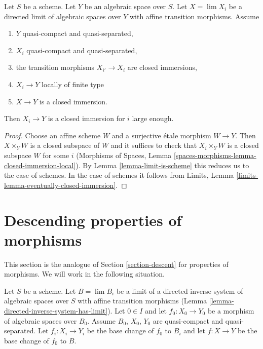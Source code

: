 \begin{lemma}
\label{lemma-eventually-closed-immersion}
Let $S$ be a scheme. Let $Y$ be an algebraic space over $S$.
Let $X = \lim X_i$ be a directed limit of algebraic spaces
over $Y$ with affine transition morphisms. Assume
\begin{enumerate}
\item $Y$ quasi-compact and quasi-separated,
\item $X_i$ quasi-compact and quasi-separated,
\item the transition morphisms $X_{i'} \to X_i$ are closed immersions,
\item $X_i \to Y$ locally of finite type
\item $X \to Y$ is a closed immersion.
\end{enumerate}
Then $X_i \to Y$ is a closed immersion for $i$ large enough.
\end{lemma}

\begin{proof}
Choose an affine scheme $W$ and a surjective \'etale morphism $W \to Y$.
Then $X \times_Y W$ is a closed subspace of $W$ and it suffices to check
that $X_i \times_Y W$ is a closed subspace $W$ for some $i$
(Morphisms of Spaces,
Lemma \ref{spaces-morphisms-lemma-closed-immersion-local}). By
Lemma \ref{lemma-limit-is-scheme} this reduces us to the case of schemes.
In the case of schemes it follows from
Limits, Lemma \ref{limits-lemma-eventually-closed-immersion}.
\end{proof}

















\section{Descending properties of morphisms}
\label{section-descent-of-properties}

\noindent
This section is the analogue of Section \ref{section-descent}
for properties of morphisms. We will work in the following situation.

\begin{situation}
\label{situation-descent-property}
Let $S$ be a scheme. Let $B = \lim B_i$ be a limit of a directed inverse system
of algebraic spaces over $S$ with affine transition morphisms
(Lemma \ref{lemma-directed-inverse-system-has-limit}).
Let $0 \in I$ and let $f_0 : X_0 \to Y_0$ be a morphism of algebraic spaces
over $B_0$. Assume $B_0$, $X_0$, $Y_0$ are quasi-compact and quasi-separated.
Let $f_i : X_i \to Y_i$ be the base change of $f_0$ to $B_i$ and
let $f : X \to Y$ be the base change of $f_0$ to $B$.
\end{situation}

